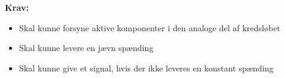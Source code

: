 \vspace{3mm}
\textbf{Krav:}
\begin{itemize} 
\item[\text{\sffamily \checkmark}] Skal kunne forsyne aktive komponenter i den analoge del af kredsløbet
\item[\text{\sffamily \checkmark}] Skal kunne levere en jævn spænding
\item[\text{\sffamily \checkmark}] Skal kunne give et signal, hvis der ikke leveres en konstant spænding
\end{itemize}

